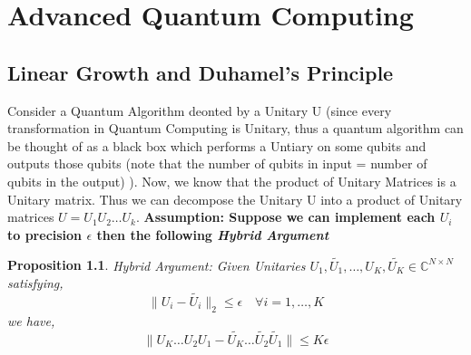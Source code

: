 \documentclass[12pt, oneside]{book}
\newtheorem{proposition}[theorem]{Proposition}
\theoremstyle{definition}
\theoremstyle{definition}
\theoremstyle{remark}
\begin{document}
\chapter{Advanced Quantum Computing}
\section{Linear Growth and Duhamel's Principle}
Consider a Quantum Algorithm deonted by a Unitary U (since every
transformation in Quantum Computing is Unitary, thus a quantum algorithm can be thought of as a black box
which performs a Untiary on some qubits and outputs those qubits (note that the number
of qubits in input = number of qubits in the output) ). Now,
we know that the product of Unitary Matrices is a Unitary matrix. Thus we
can decompose the Unitary U into a product of Unitary matrices $U=U_1U_2\ldots U_k$.
\textbf{Assumption: Suppose we can implement each $U_i$ to precision $\epsilon$ then the following \textit{Hybrid Argument}}
\begin{proposition}
    Hybrid Argument: Given Unitaries $U_1,\tilde{U_1},\ldots,U_K,\tilde{U_K} \in \mathbb{C}^{N \times N}$
    satisfying,
    \[\|U_i-\tilde{U_i}\|_2 \leq \epsilon \quad \forall i=1,\ldots,K\]
    we have,
    \[\|U_K\ldots U_2 U_1 - \tilde{U_K}\ldots \tilde{U_2}\tilde{U_1}\| \leq K\epsilon\]
\end{proposition}
\end{document}
